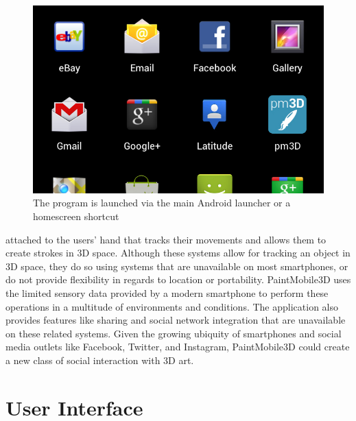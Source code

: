 \documentclass{chi-ext}
\begin{document}
\begin{figure}
\parbox{\columnwidth}{
  \centering
  \includegraphics[width=\columnwidth]{icon.jpg}
  \caption{The program is launched via the main Android launcher or a homescreen shortcut}
  \label{fig:icon}
}
\end{figure}

\pagebreak

attached to the users' hand that tracks their
movements and allows them to create strokes in 3D space\cite{schkolne2002drawing}. 
Although these systems allow for tracking an
object in 3D space, they do so using systems that are unavailable on most
smartphones, or do not provide flexibility in regards to location or
portability. PaintMobile3D uses the limited sensory data provided by a modern
smartphone to perform these operations in a multitude of environments and
conditions. The application also provides features like sharing and social
network integration that are unavailable on these related systems. Given the
growing ubiquity of smartphones and social media outlets like Facebook,
Twitter, and Instagram, PaintMobile3D could create a new class of social
interaction with 3D art.


\section{User Interface}
\end{document}
